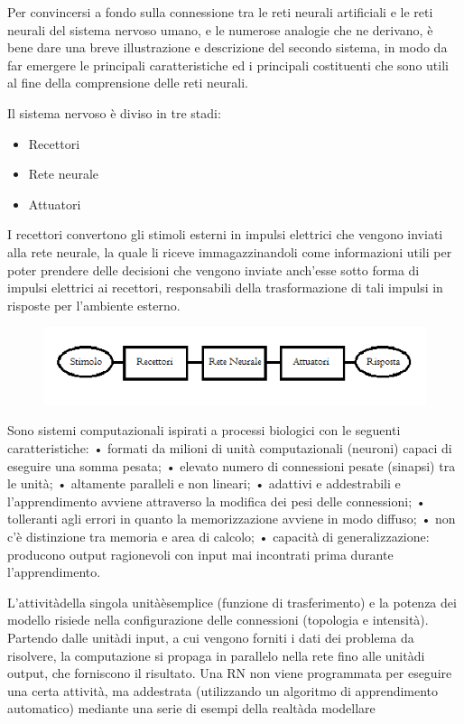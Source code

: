 \documentclass[12pt,a4paper,oneside]{book}
\begin{document}
		Per convincersi a fondo sulla connessione tra le reti neurali artificiali e le reti neurali del sistema nervoso umano, e le numerose analogie che ne derivano, è bene dare una breve illustrazione e descrizione del secondo sistema, in modo da far emergere le principali caratteristiche ed i principali costituenti che sono utili al fine della comprensione delle reti neurali.
		
		Il sistema nervoso è diviso in tre stadi:
		\begin{itemize}
			\item Recettori
			\item Rete neurale
			\item Attuatori
		\end{itemize}
		
		I recettori convertono gli stimoli esterni in impulsi elettrici che vengono inviati alla rete neurale, la quale li riceve immagazzinandoli come informazioni utili per poter prendere delle decisioni che vengono inviate anch'esse sotto forma di impulsi elettrici ai recettori, responsabili della trasformazione di tali impulsi in risposte per l'ambiente esterno.
	
	\begin{figure}[h]
		\centering
		\includegraphics[width=0.7\linewidth]{IMMAGINI/GRAFOSISTNERV}
		\caption{}
		\label{fig: stadi sistema nervoso}
	\end{figure}
	
	
	
	
		Sono sistemi computazionali ispirati a processi biologici con le seguenti caratteristiche:  • formati da milioni di unità computazionali (neuroni) capaci di eseguire una somma pesata;  • elevato numero di connessioni pesate (sinapsi) tra le unità;  • altamente paralleli e non lineari;  • adattivi e addestrabili e l'apprendimento avviene attraverso la modifica dei pesi delle connessioni;  • tolleranti agli errori in quanto la memorizzazione avviene in modo diffuso;  • non c'è distinzione tra memoria e area di calcolo;  • capacità di generalizzazione: producono output ragionevoli con input mai incontrati prima durante l'apprendimento. 
		
		L'attivitàdella singola unitàèsemplice (funzione di trasferimento) e la potenza dei modello risiede nella configurazione delle connessioni (topologia e intensità).
		Partendo dalle unitàdi input, a cui vengono forniti i dati dei problema da risolvere, la computazione si propaga in parallelo nella rete fino alle unitàdi output, che forniscono il risultato.
		Una RN non viene programmata per eseguire una certa attività, ma addestrata (utilizzando un algoritmo di apprendimento automatico) mediante una serie di esempi della realtàda modellare
		
\end{document}
